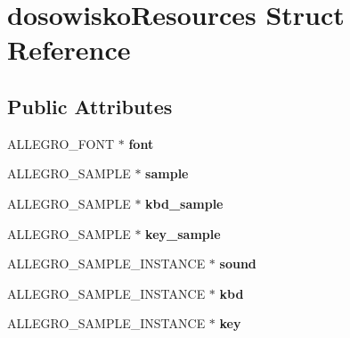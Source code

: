 \hypertarget{structdosowiskoResources}{\section{dosowisko\+Resources Struct Reference}
\label{structdosowiskoResources}
}
\subsection*{Public Attributes}
\begin{DoxyCompactItemize}
\item 
\hypertarget{structdosowiskoResources_afa38985e9ba30f6b36cf662b4c40d5b5}{A\+L\+L\+E\+G\+R\+O\+\_\+\+F\+O\+N\+T $\ast$ {\bfseries font}}\label{structdosowiskoResources_afa38985e9ba30f6b36cf662b4c40d5b5}

\item 
\hypertarget{structdosowiskoResources_a7a0d044fe1a2dd54cdc52beda10d85ea}{A\+L\+L\+E\+G\+R\+O\+\_\+\+S\+A\+M\+P\+L\+E $\ast$ {\bfseries sample}}\label{structdosowiskoResources_a7a0d044fe1a2dd54cdc52beda10d85ea}

\item 
\hypertarget{structdosowiskoResources_acf3efb41165fcded4ff22ced9035a36c}{A\+L\+L\+E\+G\+R\+O\+\_\+\+S\+A\+M\+P\+L\+E $\ast$ {\bfseries kbd\+\_\+sample}}\label{structdosowiskoResources_acf3efb41165fcded4ff22ced9035a36c}

\item 
\hypertarget{structdosowiskoResources_a31e670310862c2dcae0db7eb94a13a5f}{A\+L\+L\+E\+G\+R\+O\+\_\+\+S\+A\+M\+P\+L\+E $\ast$ {\bfseries key\+\_\+sample}}\label{structdosowiskoResources_a31e670310862c2dcae0db7eb94a13a5f}

\item 
\hypertarget{structdosowiskoResources_a3269bd7d39b2ec47f9a307bfff9d5206}{A\+L\+L\+E\+G\+R\+O\+\_\+\+S\+A\+M\+P\+L\+E\+\_\+\+I\+N\+S\+T\+A\+N\+C\+E $\ast$ {\bfseries sound}}\label{structdosowiskoResources_a3269bd7d39b2ec47f9a307bfff9d5206}

\item 
\hypertarget{structdosowiskoResources_abada8feac690817d702f8bbf96073d23}{A\+L\+L\+E\+G\+R\+O\+\_\+\+S\+A\+M\+P\+L\+E\+\_\+\+I\+N\+S\+T\+A\+N\+C\+E $\ast$ {\bfseries kbd}}\label{structdosowiskoResources_abada8feac690817d702f8bbf96073d23}

\item 
\hypertarget{structdosowiskoResources_a778502108ac2f48345380b522c11502b}{A\+L\+L\+E\+G\+R\+O\+\_\+\+S\+A\+M\+P\+L\+E\+\_\+\+I\+N\+S\+T\+A\+N\+C\+E $\ast$ {\bfseries key}}\label{structdosowiskoResources_a778502108ac2f48345380b522c11502b}


\end{DoxyCompactItemize}
